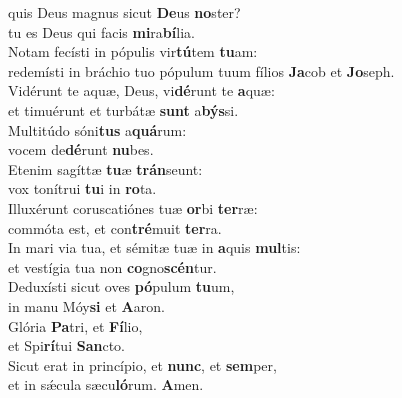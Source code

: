 \oddverse  quis Deus magnus sicut \textbf{De}us \textbf{no}ster?~\*\\
\oddverse tu es Deus qui facis \textbf{mi}ra\textbf{bí}lia.\\
\evenverse Notam fecísti in pópulis vir\textbf{tú}tem \textbf{tu}am:~\*\\
\evenverse redemísti in bráchio tuo pópulum tuum fílios \textbf{Ja}cob et \textbf{Jo}seph.\\
\oddverse Vidérunt te aquæ, Deus, vi\textbf{dé}runt te \textbf{a}quæ:~\*\\
\oddverse et timuérunt et turbátæ \textbf{sunt} a\textbf{býs}si.\\
\evenverse Multitúdo sóni\textbf{tus} a\textbf{quá}rum:~\*\\
\evenverse vocem de\textbf{dé}runt \textbf{nu}bes.\\
\oddverse Etenim sagíttæ \textbf{tu}æ \textbf{trán}seunt:~\*\\
\oddverse vox tonítrui \textbf{tu}i in \textbf{ro}ta.\\
\evenverse Illuxérunt coruscatiónes tuæ \textbf{or}bi \textbf{ter}ræ:~\*\\
\evenverse commóta est, et con\textbf{tré}muit \textbf{ter}ra.\\
\oddverse In mari via tua, et sémitæ tuæ in \textbf{a}quis \textbf{mul}tis:~\*\\
\oddverse et vestígia tua non \textbf{co}gno\textbf{scén}tur.\\
\evenverse Deduxísti sicut oves \textbf{pó}pulum \textbf{tu}um,~\*\\
\evenverse in manu Móy\textbf{si} et \textbf{A}aron.\\
\oddverse Glória \textbf{Pa}tri, et \textbf{Fí}lio,~\*\\
\oddverse et Spi\textbf{rí}tui \textbf{San}cto.\\
\evenverse Sicut erat in princípio, et \textbf{nunc}, et \textbf{sem}per,~\*\\
\evenverse et in sǽcula sæcu\textbf{ló}rum. \textbf{A}men.\\
